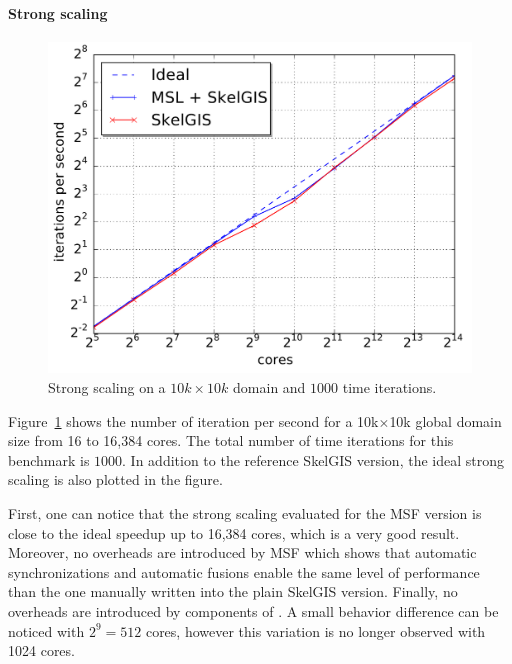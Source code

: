 \paragraph{\textbf{Strong scaling}}
\begin{figure}[t]\begin{center}
  \includegraphics[width=.6\textwidth]{../results/strong_scaling/10K_1K/median_strong.pdf}
  \caption{Strong scaling on a $10k \times 10k$ domain and $1000$ time iterations.}
  \label{fig:strong}
\end{center}\end{figure}

Figure~\ref{fig:strong} shows the number of iteration per second for a 10k$\times$10k global domain size from 16 to 16,384 cores. The total number of time iterations for this benchmark is $1000$. In addition to the reference SkelGIS version, the ideal strong scaling is also plotted in the figure.

First, one can notice that the strong scaling evaluated for the MSF version is close to the ideal speedup up to 16,384 cores, which is a very good result. Moreover, no overheads are introduced by MSF which shows that automatic synchronizations and automatic fusions enable the same level of performance than the one manually written into the plain SkelGIS version. Finally, no overheads are introduced by components of \llc. A small behavior difference can be noticed with $2^9=512$ cores, however this variation is no longer observed with 1024 cores.

